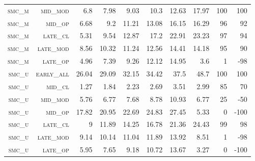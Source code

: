 \begin{landscape}
\begin{table}[!htbp]
\begin{tabular}{@{}rrrrrrr|rrr@{}}
 \textsc{smc\_m}      &  \textsc{mid\_mod  }        &   6.8         &  7.98    &  9.03      &  10.3             &  12.63     &  17.97    &  100   &  100     \\
 \textsc{smc\_m}      &  \textsc{mid\_op   }        &   6.68        &  9.2     &  11.21     &  13.08            &  16.15     &  16.29    &  96    &  92     \\
 \textsc{smc\_m}      &  \textsc{late\_cl  }        &   5.31        &  9.54    &  12.87     &  17.2             &  22.91     &  23.23    &  97    &  94      \\
 \textsc{smc\_m}      &  \textsc{late\_mod }        &   8.56        &  10.32   &  11.24     &  12.56            &  14.41     &  14.18    &  95    &  90      \\
 \textsc{smc\_m}      &  \textsc{late\_op  }        &   4.96        &  7.39    &  9.26      &  12.12            &  14.95     &  3.6      &  1     &  -98      \\
 \textsc{smc\_u}      &  \textsc{early\_all}        &   26.04       &  29.09   &  32.15     &  34.42            &  37.5      &  48.7     &  100   &  100      \\
 \textsc{smc\_u}      &  \textsc{mid\_cl   }        &   1.27        &  1.84    &  2.23      &  2.69             &  3.51      &  2.99     &  85    &  70       \\
 \textsc{smc\_u}      &  \textsc{mid\_mod  }        &   5.76        &  6.77    &  7.68      &  8.78             &  10.93     &  6.77     &  25    &  -50    \\
 \textsc{smc\_u}      &  \textsc{mid\_op   }        &   17.82       &  20.95   &  22.69     &  24.83            &  27.45     &  5.33     &  0     &  -100      \\
 \textsc{smc\_u}      &  \textsc{late\_cl  }        &   9           &  11.89   &  14.25     &  16.78            &  21.36     &  24.43    &  99    &  98      \\
 \textsc{smc\_u}      &  \textsc{late\_mod }        &   9.14        &  10.14   &  11.04     &  11.89            &  13.92     &  8.51     &  1     &  -98      \\
 \textsc{smc\_u}      &  \textsc{late\_op  }        &   5.95        &  7.65    &  9.18      &  10.72            &  13.67     &  3.27     &  0     &  -100      \\
\end{tabular}
\end{table}
\end{landscape}

